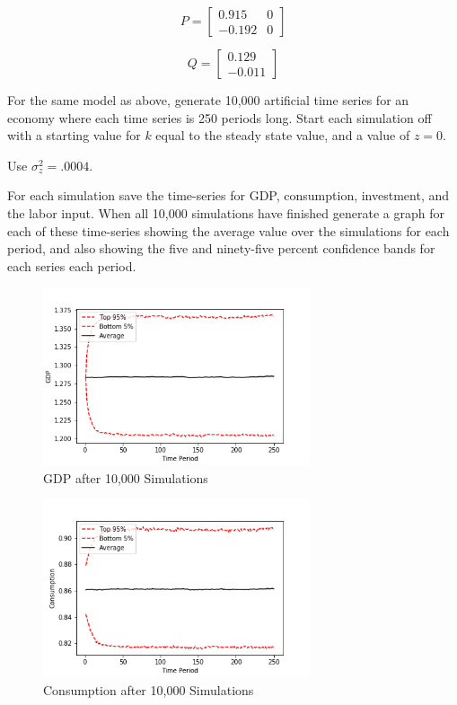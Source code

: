 \documentclass[letterpaper,11pt]{article}
\theoremstyle{definition}
\begin{document}
\begin{spacing}{1.5}
	\[
		P =
		\begin{bmatrix}
			0.915 & 0 \\
			-0.192 & 0
		\end{bmatrix}
	\]

	\[
		Q =
		\begin{bmatrix}
			0.129\\
			-0.011
		\end{bmatrix}
	\]

	\begin{Exercise} \label{Linear_HW_Base_Sims}
		For the same model as above, generate 10,000 artificial time series for an economy where each time series is 250 periods long.  Start each simulation off with a starting value for $k$ equal to the steady state value, and a value of $z=0$.

		Use $\sigma_z^2 = .0004$.

		For each simulation save the time-series for GDP, consumption, investment, and the labor input.  When all 10,000 simulations have finished generate a graph for each of these time-series showing the average value over the simulations for each period, and also showing the five and ninety-five percent confidence bands for each series each period.
	\end{Exercise}

	\begin{figure}[H]
		\caption{GDP after 10,000 Simulations}
		\label{fig:GDP_10000}
		\includegraphics[width=0.7\textwidth]{GDP.png}
	\end{figure}

	\begin{figure}[H]
		\caption{Consumption after 10,000 Simulations}
		\label{fig:consumption_10000}
		\includegraphics[width=0.7\textwidth]{consumption.png}
	\end{figure}


\end{spacing}
\end{document}
